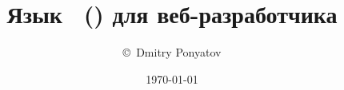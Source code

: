 
\title{Язык \ex\ (\erl) для веб-разработчика}
\author{\copyright\ Dmitry Ponyatov }
\date{\today}

    
        \ \\
        
        {\Large \thetitle}

        \ \\

        \theauthor
        
        \ \\
        
        \thedate

        \begin{flushright}
        \end{flushright}

    \tableofcontents
    
    

